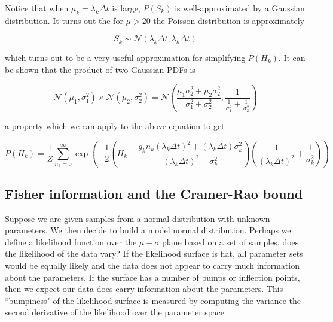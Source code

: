 \documentclass{article}
\begin{document}
Notice that when $\mu_{k} = \lambda_{k}\Delta t$ is large, $P(S_{k})$ is well-approximated by a Gaussian distribution. It turns out the for $\mu > 20$ the Poisson distribution is approximately 

\begin{equation*}
S_{k} \sim \mathcal{N}(\lambda_{k}\Delta t, \lambda_{k}\Delta t)
\end{equation*} 

which turns out to be a very useful approximation for simplifying $P(H_{k})$. It can be shown that the product of two Gaussian PDFs is

\begin{equation*}
\mathcal{N}(\mu_{1},\sigma_{1}^{2}) \times \mathcal{N}(\mu_{2},\sigma_{2}^{2}) = \mathcal{N}\left(\frac{\mu_{1}\sigma_{2}^{2} + \mu_{2}\sigma_{2}^{2}}{\sigma_{1}^{2}+\sigma_{2}^{2}}, \frac{1}{\frac{1}{\sigma_{1}^{2}}+\frac{1}{\sigma_{2}^{2}}}\right)
\end{equation*}

a property which we can apply to the above equation to get

\begin{equation*}
P(H_{k}) = \frac{1}{Z}\sum_{n_{k}=0}^{\infty}\exp\left(-\frac{1}{2}\left(H_{k}-\frac{g_{k}n_{k}(\lambda_{k}\Delta t)^{2} +  (\lambda_{k}\Delta t)\sigma_{k}^{2}}{(\lambda_{k}\Delta t)^{2}+\sigma_{k}^{2}}\right)\left(\frac{1}{(\lambda_{k}\Delta t)^{2}}+\frac{1}{\sigma_{k}^{2}}\right)\right)
\end{equation*}



\subsection{Fisher information and the Cramer-Rao bound}

Suppose we are given samples from a normal distribution with unknown parameters. We then decide to build a model normal distribution. Perhaps we define a likelihood function over the $\mu-\sigma$ plane based on a set of samples, does the likelihood of the data vary? If the likelihood surface is flat, all parameter sets would be equally likely and the data does not appear to carry much information about the parameters. If the surface has a number of bumps or inflection points, then we expect our data does carry information about the parameters. This ``bumpiness" of the likelihood surface is measured by computing the variance the second derivative of the likelihood over the parameter space\\
\end{document}
